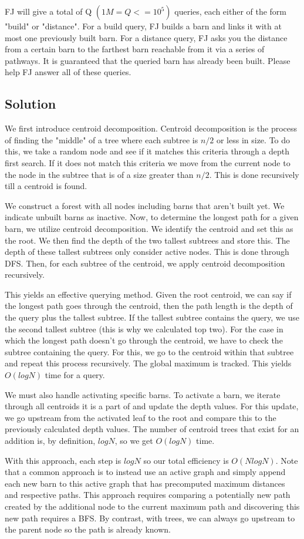 \documentclass[11pt]{article}
\begin{document}
FJ will give a total of Q $(1M=Q<=10^5)$ queries, each either of the form "build" or "distance". For a build query, FJ builds a barn and links it with at most one previously built barn. For a distance query, FJ asks you the distance from a certain barn to the farthest barn reachable from it via a series of pathways. It is guaranteed that the queried barn has already been built. Please help FJ answer all of these queries.

\subsection{Solution}

We first introduce centroid decomposition. Centroid decomposition is the process of finding the "middle" of a tree where each subtree is $n/2$ or less in size. To do this, we take a random node and see if it matches this criteria through a depth first search. If it does not match this criteria we move from the current node to the node in the subtree that is of a size greater than $n/2$. This is done recursively till a centroid is found.

We construct a forest with all nodes including barns that aren't built yet. We indicate unbuilt barns as inactive. Now, to determine the longest path for a given barn, we utilize centroid decomposition. We identify the centroid and set this as the root. We then find the depth of the two tallest subtrees and store this. The depth of these tallest subtrees only consider active nodes. This is done through DFS. Then, for each subtree of the centroid, we apply centroid decomposition recursively. 

This yields an effective querying method. Given the root centroid, we can say if the longest path goes through the centroid, then the path length is the depth of the query plus the tallest subtree. If the tallest subtree contains the query, we use the second tallest subtree (this is why we calculated top two). For the case in which the longest path doesn't go through the centroid, we have to check the subtree containing the query. For this, we go to the centroid within that subtree and repeat this process recursively. The global maximum is tracked. This yields $O(log N)$ time for a query.

We must also handle activating specific barns. To activate a barn, we iterate through all centroids it is a part of and update the depth values. For this update, we go upstream from the activated leaf to the root and compare this to the previously calculated depth values. The number of centroid trees that exist for an addition is, by definition, $log N$, so we get $O(log N)$ time.

With this approach, each step is $log N$ so our total efficiency is $O(N log N)$. Note that a common approach is to instead use an active graph and simply append each new barn to this active graph that has precomputed maximum distances and respective paths. This approach requires comparing a potentially new path created by the additional node to the current maximum path and discovering this new path requires a BFS. By contrast, with trees, we can always go upstream to the parent node so the path is already known.
\end{document}
